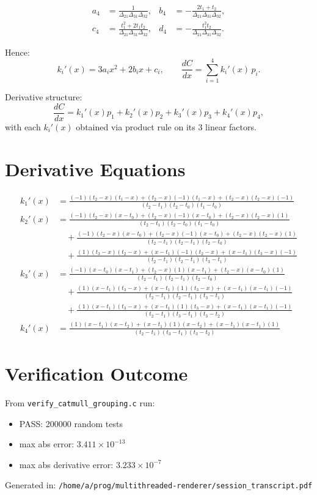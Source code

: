 \documentclass[11pt]{article}
\begin{document}
\begin{align*}
a_4&=\frac{1}{\Delta_{21}\Delta_{31}\Delta_{32}},&
b_4&=-\frac{2t_1+t_2}{\Delta_{21}\Delta_{31}\Delta_{32}},\\
c_4&=\frac{t_1^2+2t_1t_2}{\Delta_{21}\Delta_{31}\Delta_{32}},&
d_4&=-\frac{t_1^2t_2}{\Delta_{21}\Delta_{31}\Delta_{32}}.
\end{align*}

Hence:
\[
k_i'(x)=3a_i x^2+2b_i x+c_i,\qquad
\frac{dC}{dx}=\sum_{i=1}^{4}k_i'(x)\,p_i.
\]

Derivative structure:
\[
\frac{dC}{dx}=k_1'(x)p_1+k_2'(x)p_2+k_3'(x)p_3+k_4'(x)p_4,
\]
with each $k_i'(x)$ obtained via product rule on its 3 linear factors.

\section*{Derivative Equations}

\begin{align*}
k_1'(x)&=
\frac{(-1)(t_2-x)(t_1-x)+(t_2-x)(-1)(t_1-x)+(t_2-x)(t_2-x)(-1)}
{(t_2-t_1)(t_2-t_0)(t_1-t_0)} \\
k_2'(x)&=
\frac{(-1)(t_2-x)(x-t_0)+(t_2-x)(-1)(x-t_0)+(t_2-x)(t_2-x)(1)}
{(t_2-t_1)(t_2-t_0)(t_1-t_0)} \\
&\quad+
\frac{(-1)(t_2-x)(x-t_0)+(t_2-x)(-1)(x-t_0)+(t_2-x)(t_2-x)(1)}
{(t_2-t_1)(t_2-t_1)(t_2-t_0)} \\
&\quad+
\frac{(1)(t_3-x)(t_2-x)+(x-t_1)(-1)(t_2-x)+(x-t_1)(t_3-x)(-1)}
{(t_2-t_1)(t_2-t_1)(t_3-t_1)} \\
k_3'(x)&=
\frac{(-1)(x-t_0)(x-t_1)+(t_2-x)(1)(x-t_1)+(t_2-x)(x-t_0)(1)}
{(t_2-t_1)(t_2-t_1)(t_2-t_0)} \\
&\quad+
\frac{(1)(x-t_1)(t_3-x)+(x-t_1)(1)(t_3-x)+(x-t_1)(x-t_1)(-1)}
{(t_2-t_1)(t_2-t_1)(t_3-t_1)} \\
&\quad+
\frac{(1)(x-t_1)(t_3-x)+(x-t_1)(1)(t_3-x)+(x-t_1)(x-t_1)(-1)}
{(t_2-t_1)(t_3-t_1)(t_3-t_2)} \\
k_4'(x)&=
\frac{(1)(x-t_1)(x-t_2)+(x-t_1)(1)(x-t_2)+(x-t_1)(x-t_1)(1)}
{(t_2-t_1)(t_3-t_1)(t_3-t_2)}
\end{align*}

\section*{Verification Outcome}

From \texttt{verify\_catmull\_grouping.c} run:
\begin{itemize}
    \item PASS: 200000 random tests
    \item max abs error: $3.411\times10^{-13}$
    \item max abs derivative error: $3.233\times10^{-7}$
\end{itemize}

\vspace{1em}
Generated in: \texttt{/home/a/prog/multithreaded-renderer/session\_transcript.pdf}
\end{document}

